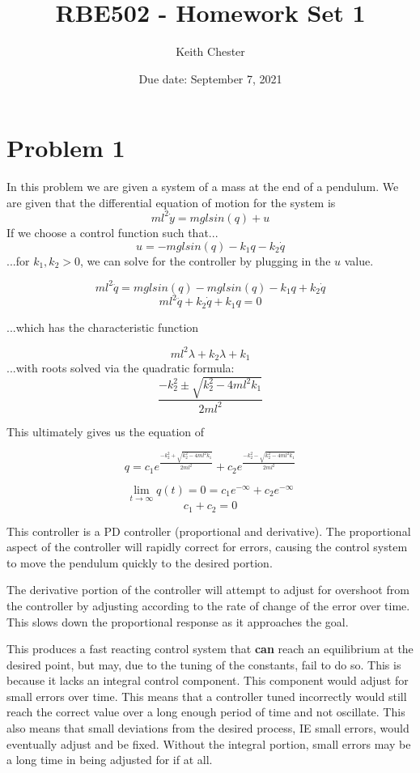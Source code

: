 \documentclass{article}
\title{RBE502 - Homework Set 1}
\author{Keith Chester}
\date{Due date: September 7, 2021}
\begin{document}
\maketitle

\section*{Problem 1}

In this problem we are given a system of a mass at the end of a pendulum. We are given that the differential equation of motion for the system is \[ml^2\dot y=mglsin(q)+u\]
If we choose a control function such that...
\[u=-mglsin(q)-k_1q-k_2\dot q\]
...for \(k_1,k_2>0\), we can solve for the controller by plugging in the \(u\) value.

\[ml^2\ddot q =mglsin(q)-mglsin(q)-k_1q+k_2\dot q\]
\[ml^2\ddot q + k_2\dot q + k_1 q = 0\]

...which has the characteristic function

\[ml^2\lambda + k_2\lambda + k_1\]
...with roots solved via the quadratic formula:
\[ \frac{-k_2^2 \pm \sqrt{k_2^2-4ml^2k_1}}{2ml^2}\]

This ultimately gives us the equation of

\[q = c_1e^{\frac{-k_2^2 + \sqrt{k_2^2-4ml^2k_1}}{2ml^2}} + c_2e^{\frac{-k_2^2 - \sqrt{k_2^2-4ml^2k_1}}{2ml^2}}\]

\[\lim_{t \to \infty} q(t) = 0 = c_1e^{-\infty}+c_2e^{-\infty}\]
\[c_1+c_2 = 0\]

This controller is a PD controller (proportional and derivative). The proportional aspect of the controller will rapidly correct for errors, causing the control system to move the pendulum quickly to the desired portion.

The derivative portion of the controller will attempt to adjust for overshoot from the controller by adjusting according to the rate of change of the error over time. This slows down the proportional response as it approaches the goal.

This produces a fast reacting control system that \textbf{can} reach an equilibrium at the desired point, but may, due to the tuning of the constants, fail to do so. This is because it lacks an integral control component. This component would adjust for small errors over time. This means that a controller tuned incorrectly would still reach the correct value over a long enough period of time and not oscillate. This also means that small deviations from the desired process, IE small errors, would eventually adjust and be fixed. Without the integral portion, small errors may be a long time in being adjusted for if at all.
\end{document}
